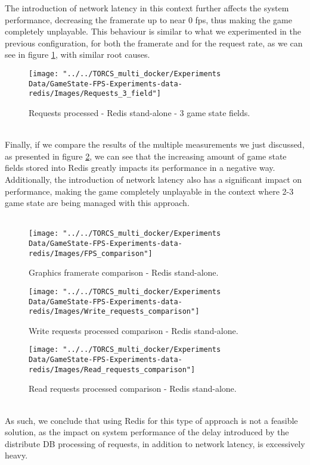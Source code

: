 The introduction of network latency in this context further affects the system performance, decreasing the framerate up to near 0 fps, thus making the game completely unplayable. This behaviour is similar to what we experimented in the previous configuration, for both the framerate and for the request rate, as we can see in figure \ref{fig:requests-3-field-redis}, with similar root causes. \\
\begin{figure}[h!]
	\centering
	\texttt{[image: "../../TORCS\_multi\_docker/Experiments Data/GameState-FPS-Experiments-data-redis/Images/Requests\_3\_field"]}
	\caption[Requests processed - Redis stand-alone - 3 game state fields]{Requests processed - Redis stand-alone - 3 game state fields.}
	\label{fig:requests-3-field-redis}
\end{figure}
\pagebreak
\\ Finally, if we compare the results of the multiple measurements we just discussed, as presented in figure \ref{fig:fps-comparison-redis}, we can see that the increasing amount of game state fields stored into Redis greatly impacts its performance in a negative way. \\
Additionally, the introduction of network latency also has a significant impact on performance, making the game completely unplayable in the context where 2-3 game state are being managed with this approach. \\ \\
\begin{figure}[h!]
	\centering
	\texttt{[image: "../../TORCS\_multi\_docker/Experiments Data/GameState-FPS-Experiments-data-redis/Images/FPS\_comparison"]}
	\caption[Graphics framerate comparison - Redis stand-alone]{Graphics framerate comparison - Redis stand-alone.}
	\label{fig:fps-comparison-redis}
\end{figure}
\begin{figure}[h!]
	\centering
	\texttt{[image: "../../TORCS\_multi\_docker/Experiments Data/GameState-FPS-Experiments-data-redis/Images/Write\_requests\_comparison"]}
	\caption[Write requests processed comparison - Redis stand-alone]{Write requests processed comparison - Redis stand-alone.}
	\label{fig:write-requests-comparison-redis}
\end{figure}
\begin{figure}[h!]
	\centering
	\texttt{[image: "../../TORCS\_multi\_docker/Experiments Data/GameState-FPS-Experiments-data-redis/Images/Read\_requests\_comparison"]}
	\caption[Read requests processed comparison - Redis stand-alone]{Read requests processed comparison - Redis stand-alone.}
	\label{fig:read-requests-comparison-redis}
\end{figure}
\\ As such, we conclude that using Redis for this type of approach is not a feasible solution, as the impact on system performance of the delay introduced by the distribute DB processing of requests, in addition to network latency, is excessively heavy.


